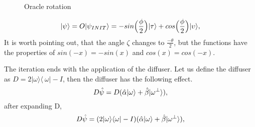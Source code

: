 \begin{figure}[ht]
\begin{center}
\caption{Oracle rotation} \label{GA_oracle_geom}
\end{center}
\end{figure}


\begin{equation}
    |\psi\rangle = O|\psi_{INIT}\rangle = -sin\Bigl(\frac{\phi}{2}\Bigr)|\tau \rangle  + cos\Bigl(\frac{\phi}{2}\Bigr)|\upsilon\rangle,
\end{equation}
It is worth pointing out, that the angle $\zeta$ changes to $\frac{-\theta}{2}$, but the functions  have the properties of $sin(-x)=-sin(x)$ and $cos(x)=cos(-x)$.


The iteration ends with the application of the diffuser.  Let us define the diffuser as $D = 2|\omega\rangle\langle\ \omega|-I$, then the diffuser has the following effect.
\begin{equation}
    D\Hat{\psi}=D(\Hat{\alpha}|\omega\rangle + \Hat{\beta}|\omega^{\perp}\rangle),
\end{equation}
after expanding D,
\begin{equation}
    D\Hat{\psi}=(2|\omega\rangle\langle\omega|-I)(\Hat{\alpha}|\omega\rangle + \Hat{\beta}|\omega^{\perp}\rangle),
\end{equation}

